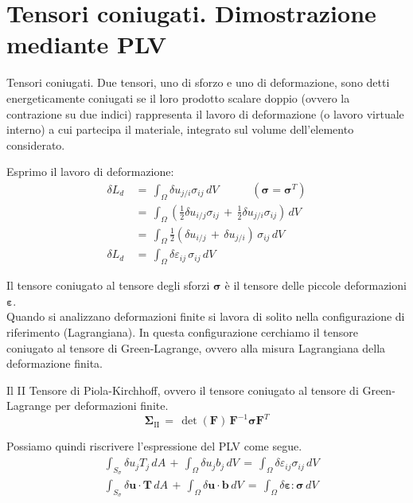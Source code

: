 \section{Tensori coniugati. Dimostrazione mediante PLV}

\begin{definizioneBox}
Tensori coniugati. Due tensori, uno di sforzo e uno di deformazione, sono detti energeticamente coniugati
se il loro prodotto scalare doppio (ovvero la contrazione su due indici) rappresenta il lavoro di
deformazione (o lavoro virtuale interno) a cui partecipa il materiale, integrato sul volume
dell'elemento considerato.
\end{definizioneBox}
Esprimo  il lavoro di deformazione:
\begin{align*}
    \delta L_d \, &=\,  \int_{\Omega} \delta u_{j/i}  \sigma_{ij}  \, dV  
      \quad\quad\quad \left( \boldsymbol{\sigma} = \boldsymbol{\sigma}^T \right)\\
    &= \,  \int_{\Omega}  \left( \frac{1}{2} \delta u_{i/j}  \sigma_{ij} \, + \,        \frac{1}{2} \delta u_{j/i}  \sigma_{ij} \right) \, dV  \\
    &=  \,  \int_{\Omega}  \frac{1}{2} \left( \delta u_{i/j}  \, + \,       \delta u_{j/i}  \right)\,\sigma_{ij}  \, dV  \\
     \delta L_d \, &= \,  \int_{\Omega}  \delta \varepsilon_{ij}  \,\sigma_{ij}  \, dV 
\end{align*}

Il tensore coniugato al tensore degli sforzi $\boldsymbol{\sigma}$ è il tensore delle piccole deformazioni $\boldsymbol{\varepsilon}$.\\

Quando si analizzano deformazioni finite si lavora di solito nella configurazione di riferimento (Lagrangiana). In questa configurazione cerchiamo il tensore coniugato al tensore di Green-Lagrange, ovvero alla misura Lagrangiana della deformazione finita. 

\begin{definizioneBox}
    Il II Tensore di Piola-Kirchhoff, ovvero il tensore coniugato al tensore di Green-Lagrange per deformazioni finite.
    \begin{equation*}
        \boldsymbol{\Sigma}_{\mathrm{II}} \,= \, \det (\boldsymbol{F} )\, \boldsymbol{F}^{-1} \boldsymbol{\sigma} \boldsymbol{F}^T
    \end{equation*}
\end{definizioneBox}

Possiamo quindi riscrivere l'espressione del PLV come segue.
\begin{align*}
     & \int_{S_{\sigma}}  \delta u_j T_j \, dA  \, +\,\int_{\Omega} \delta u_{j}  b_j  \, dV \, = \, \int_{\Omega} \delta \varepsilon_{ij}  \sigma_{ij}  \, dV   \\
    &  \int_{S_{\sigma}} \delta \mathbf{u} \cdot \mathbf{T} \, dA 
    \,+\, \int_{\Omega} \delta \mathbf{u} \cdot \mathbf{b} \, dV 
    \,=\, \int_{\Omega} \delta \boldsymbol{\varepsilon} : \boldsymbol{\sigma} \, dV
\end{align*}









